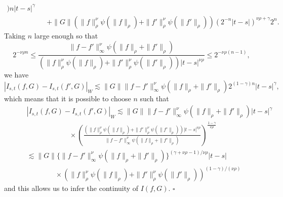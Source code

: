 \documentclass[a4paper,11pt]{article}
\newenvironment{proof}{{\sc Proof.}}{\hfill$\square$}
\begin{document}
\begin{proof}
\begin{eqnarray*}
{    ) n}  |t-s|^{\gamma}\\
    &  & + \|G\| ( \| f \|^{\nu}_{\rho} \psi ( \| f \|_{\rho} ) + \| f'
    \|^{\nu}_{\rho} \psi ( \| f' \|_{\rho} ) )  ( 2^{-n} |t-s| )^{\nu \rho +
    \gamma} 2^{n}.
  \end{eqnarray*}
  Taking $n$ large enough so that
  \[ 2^{- \nu \rho n} \leqslant \frac{\|f-f' \|^{\nu}_{\infty} \psi ( \| f
     \|_{\rho} + \| f' \|_{\rho} )}{( \| f \|^{\nu}_{\rho} \psi ( \| f
     \|_{\rho} ) + \| f' \|^{\nu}_{\rho} \psi ( \| f' \|_{\rho} ) ) |t-s|^{\nu
     \rho}} \leqslant 2^{- \nu \rho ( n-1 )}, \]
  we have
  \[ |I_{s,t} (f,G)-I_{s,t} (f' ,G)|_{W} \lesssim \|G\|  \|f-f'
     \|^{\nu}_{\infty} \psi ( \| f \|_{\rho} + \| f' \|_{\rho} ) 2^{(1- \gamma
     ) n}  |t-s|^{\gamma}, \]
  which means that it is possible to choose $n$ such that
  \begin{equation*}\begin{split} & |I_{s,t} (f,G)-I_{s,t} (f' ,G)|_{W}   \lesssim \|G\|  \|f-f'
     \|^{\nu}_{\infty} \psi ( \| f \|_{\rho} + \| f' \|_{\rho} ) 
     |t-s|^{\gamma}  \\  
     		& \qquad \qquad \qquad  \times \left( \frac{( \| f \|^{\nu}_{\rho} \psi ( \| f \|_{\rho}
     ) + \| f' \|^{\nu}_{\rho} \psi ( \| f' \|_{\rho} ) )|t-s|^{\nu \rho}
     }{\|f-f' \|^{\nu}_{\infty} \psi ( \| f \|_{\rho} + \| f' \|_{\rho} )}
     \right)^{\frac{1- \gamma}{\nu \rho}}
     \\  
     		\qquad & \lesssim \|G\| \{ \|f-f' \|^{\nu}_{\infty} \psi ( \| f \|_{\rho} + \| f'
     \|_{\rho} ) \}^{( \gamma + \nu \rho -1 ) / \nu \rho}  |t-s|  \\ & \qquad \qquad \times ( \| f
     \|^{\nu}_{\rho} \psi ( \| f \|_{\rho} ) + \| f' \|^{\nu}_{\rho} \psi ( \|
     f' \|_{\rho} ) )^{(1- \gamma ) / ( \nu \rho )} 
     \end{split}\end{equation*}
  and this allows us to infer the continuity of $I ( f,G )$.
\end{proof}
\end{document}
